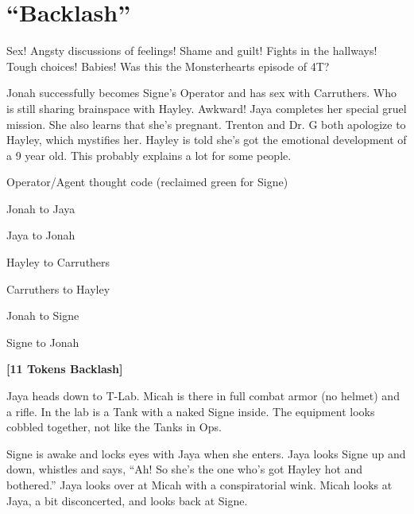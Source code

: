 \setcounter{chapter}{ 36 }
\chapter{\textbf{``Backlash''} }







Sex!  Angsty discussions of feelings!  Shame and guilt!  Fights in the hallways!  Tough choices!  Babies!   Was this the Monsterhearts episode of 4T?



Jonah successfully becomes Signe's Operator and has sex with Carruthers.  Who is still sharing brainspace with Hayley.  Awkward!  Jaya completes her special gruel mission.  She also learns that she's pregnant.  Trenton and Dr. G both apologize to Hayley, which mystifies her.  Hayley is told she's got the emotional development of a 9 year old.  This probably explains a lot for some people.



Operator/Agent thought code (reclaimed green for Signe)

 {\color[RGB]{74,134,232}Jonah to Jaya} 

 {\color[RGB]{255,0,0}Jaya to Jonah} 

 {\color[RGB]{230,145,56}Hayley to Carruthers} 

 {\color[RGB]{153,0,255}Carruthers to Hayley } 

 {\color[RGB]{194,123,160}Jonah to Signe} 

 {\color[RGB]{106,168,79}Signe to Jonah} 



\noindent\hrulefill





\textbf{{[}11 Tokens Backlash{]}}



Jaya heads down to T-Lab.  Micah is there in full combat armor (no helmet) and a rifle.  In the lab is a Tank with a naked Signe inside.  The equipment looks cobbled together, not like the Tanks in Ops.



Signe is awake and locks eyes with Jaya when she enters.  Jaya looks Signe up and down, whistles and says, ``Ah!  So she's the one who's got Hayley hot and bothered.''  Jaya looks over at Micah with a conspiratorial wink.  Micah looks at Jaya, a bit disconcerted, and looks back at Signe.



